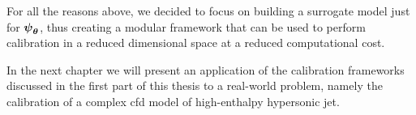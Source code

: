 \smallskip
For all the reasons above, we decided to focus on building a surrogate model just for $\boldsymbol{\psi}_{\boldsymbol{\theta}}$, thus creating a modular framework that can be used to perform calibration in a reduced dimensional space at a reduced computational cost. 

\smallskip
In the next chapter we will present an application of the calibration frameworks discussed in the first part of this thesis to a real-world problem, namely the calibration of a complex \gls{cfd} model of high-enthalpy hypersonic jet.